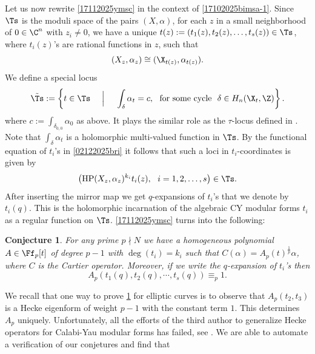 \documentclass[11pt,leqno]{article}
\newtheorem{theo}{Theorem}
\newtheorem{conj}{Conjecture}
\theoremstyle{remark}
\theoremstyle{definition}
\begin{document}
Let us now rewrite \cref{17112025ymsc} in the context of \cref{17102025bimsa-1}. Since $\Ts$ is the moduli space of the pairs $(X,\alpha)$, for each $z$ in a small neighborhood of $0\in\C^n$ with $z_i\not=0$, we have a unique $t(z):=(t_1(z),t_2(z),\ldots,t_s(z))\in\Ts$, where $t_i(z)$'s are rational functions in $z$,  such that 
$$
(X_z,\alpha_z)\cong (\X_{t(z)},\alpha_{t(z)}).
$$
We define a special locus
$$
\tilde\Ts:=\left\{ t\in \Ts \ \ \ \ \Big| \ \ \ \ 
\int_{\delta}\alpha_t
=c,\ \ \hbox{for some cycle} \ \  \delta\in H_n(\X_t,\Z) \right \}.
$$
where $c:=\int_{\delta_{0,0}}\alpha_0$ as above. It plays the similar role as the $\tau$-locus defined in \cite[Section 4.2]{GMCD-MQCY3}.
Note that $ \int_{\delta}\alpha_t$ is a holomorphic multi-valued function in $\Ts$. 
By the functional equation of $t_i$'s in \eqref{02122025bri} it follows that such a loci in $t_i$-coordinates is given by %
$$
\left ({\rm HP}(X_z,\alpha_z)^{k_i}t_i(z),\ \ i=1,2,\ldots,s\right )\in\Ts.
$$
After inserting the mirror map we get $q$-expansions of $t_i$'s that we denote by $t_i(q)$. This is the holomorphic incarnation of the algebraic CY modular forms $t_i$ as a regular function on $\Ts$. \cref{17112025ymsc} turns into the following: 
\begin{conj} \label{02112025huairou}
For any prime $p\nmid N$ we have a homogeneous polynomial $A\in \Ff_p[t]$ of degree $p-1$ with $\deg(t_i)=k_i$ such that $C(\alpha)=A_p(t)^{\frac{1}{p}}\alpha$, where $C$ is the Cartier operator. Moreover, if we write the $q$-expansion of $t_i$'s then 
$$
A_p(t_1(q),t_2(q),\cdots, t_s(q))\equiv_p1. 
$$
\end{conj}
We recall that one way to prove \cref{02112025huairou} for elliptic curves is to observe that $A_p(t_2,t_3)$ is a Hecke eigenform of weight $p-1$ with the constant term $1$. This determines $A_p$ uniquely. Unfortunately, all the efforts of the third author to generalize Hecke operators for Calabi-Yau modular forms has failed, see \cite[Section 11.2]{GMCD-MQCY3}. %
We are able to automate a verification of our conjetures and find that
\end{document}
